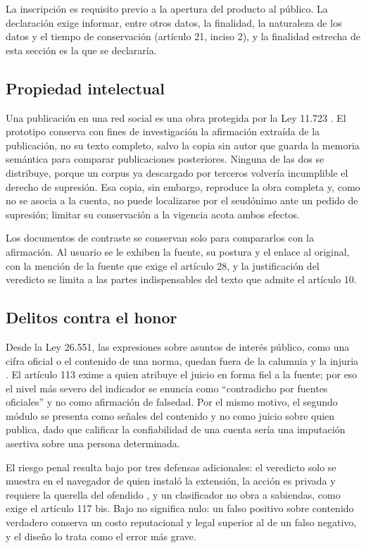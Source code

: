 La inscripción es requisito previo a la apertura del producto al público. La declaración exige informar, entre otros datos, la finalidad, la naturaleza de los datos y el tiempo de conservación (artículo 21, inciso 2), y la finalidad estrecha de esta sección es la que se declararía.

\subsection{Propiedad intelectual}

Una publicación en una red social es una obra protegida por la Ley 11.723 \parencite{CongresoNacion1933}. El prototipo conserva con fines de investigación la afirmación extraída de la publicación, no su texto completo, salvo la copia sin autor que guarda la memoria semántica para comparar publicaciones posteriores. Ninguna de las dos se distribuye, porque un corpus ya descargado por terceros volvería incumplible el derecho de supresión. Esa copia, sin embargo, reproduce la obra completa y, como no se asocia a la cuenta, no puede localizarse por el seudónimo ante un pedido de supresión; limitar su conservación a la vigencia acota ambos efectos.

Los documentos de contraste se conservan solo para compararlos con la afirmación. Al usuario se le exhiben la fuente, su postura y el enlace al original, con la mención de la fuente que exige el artículo 28, y la justificación del veredicto se limita a las partes indispensables del texto que admite el artículo 10.

\subsection{Delitos contra el honor}

Desde la Ley 26.551, las expresiones sobre asuntos de interés público, como una cifra oficial o el contenido de una norma, quedan fuera de la calumnia y la injuria \parencite{CongresoNacion2009}. El artículo 113 exime a quien atribuye el juicio en forma fiel a la fuente; por eso el nivel más severo del indicador se enuncia como \enquote{contradicho por fuentes oficiales} y no como afirmación de falsedad. Por el mismo motivo, el segundo módulo se presenta como señales del contenido y no como juicio sobre quien publica, dado que calificar la confiabilidad de una cuenta sería una imputación asertiva sobre una persona determinada.

El riesgo penal resulta bajo por tres defensas adicionales: el veredicto solo se muestra en el navegador de quien instaló la extensión, la acción es privada y requiere la querella del ofendido \parencite{CongresoNacion1984}, y un clasificador no obra a sabiendas, como exige el artículo 117 bis. Bajo no significa nulo: un falso positivo sobre contenido verdadero conserva un costo reputacional y legal superior al de un falso negativo, y el diseño lo trata como el error más grave.

